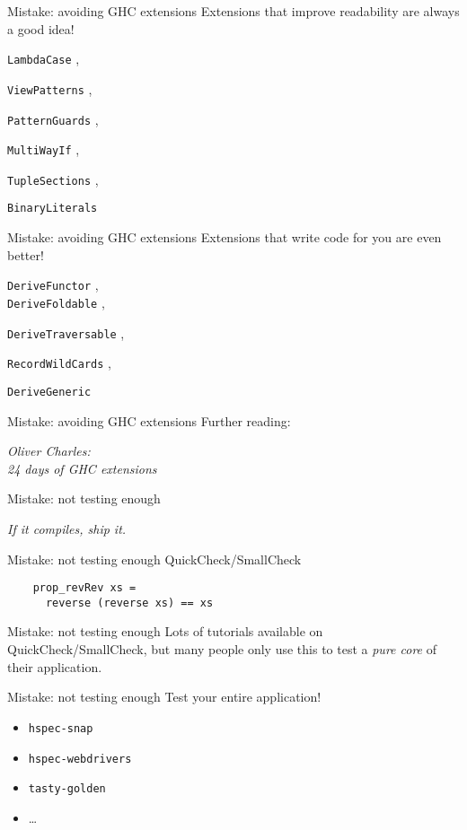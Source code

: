 \documentclass[20pt]{beamer}
\newcommand{\vspaced}{
    \vspace{5mm}
}
\newcommand{\code}[1]{
    \texttt{\small{#1}}
}
\begin{document}
\begin{frame}{Mistake: avoiding GHC extensions}
    Extensions that improve readability are always a good idea! \\
    \vspaced
    \code{LambdaCase},
    \code{ViewPatterns},
    \code{PatternGuards},
    \code{MultiWayIf},
    \code{TupleSections},
    \code{BinaryLiterals}
\end{frame}

\begin{frame}{Mistake: avoiding GHC extensions}
    Extensions that write code for you are even better! \\
    \vspaced
    \code{DeriveFunctor}, \\
    \code{DeriveFoldable},
    \code{DeriveTraversable},
    \code{RecordWildCards},
    \code{DeriveGeneric}
\end{frame}

\begin{frame}{Mistake: avoiding GHC extensions}
    Further reading: \\
    \vspaced
    \emph{Oliver Charles: \\
    24 days of GHC extensions}
\end{frame}


\begin{frame}{Mistake: not testing enough}
    \begin{center}
    \emph{If it compiles, ship it.}
    \end{center}
\end{frame}

\begin{frame}[fragile]{Mistake: not testing enough}
    QuickCheck/SmallCheck \\
    \vspaced
    \begin{lstlisting}
    prop_revRev xs =
      reverse (reverse xs) == xs
    \end{lstlisting}
\end{frame}

\begin{frame}{Mistake: not testing enough}
    Lots of tutorials available on QuickCheck/SmallCheck, but many people only
    use this to test a \emph{pure core} of their application.
\end{frame}

\begin{frame}{Mistake: not testing enough}
    Test your entire application! \\
    \vspaced
    \begin{itemize}
    \item \code{hspec-snap}
    \item \code{hspec-webdrivers}
    \item \code{tasty-golden}
    \item \ldots
    \end{itemize}
\end{frame}
\end{document}
